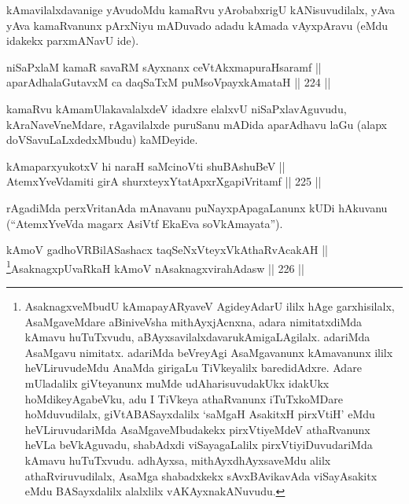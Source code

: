 \begin{artha}
kAmavilalxdavanige yAvudoMdu kamaRvu yArobabxrigU kANisuvudilalx, yAva
yAva kamaRvanunx pArxNiyu mADuvado adadu kAmada vAyxpAravu (eMdu
idakekx parxmANavU ide).
\end{artha}

\begin{shl}
niSaPxlaM kamaR savaRM sAyxnanx ceVtAkxmapuraHsaramf || \\
aparAdhalaGutavxM ca daqSaTxM puMsoV\s payxkAmataH \hfill || 224 ||  
\end{shl}

\begin{artha}
kamaRvu kAma\s mUlakavalalxdeV idadxre elalxvU niSaPxlavAguvudu,
kAraNaveVneMdare, rAgavilalxde puruSanu mADida aparAdhavu laGu (alapx
doVSavuLaLxdedxMbudu) kaMDeyide.
\end{artha}

\begin{shl}
kAmaparxyukotxV hi naraH saMcinoVti shuBAshuBeV || \\
AtemxYveVdamiti girA shurxteyxYtatApxrXgapiVritamf \hfill || 225 ||  
\end{shl}

\begin{artha}
rAgadiMda perxVritanAda mAnavanu puNayxpApagaLanunx kUDi hAkuvanu (``AtemxYveVda magarx AsiVtf EkaEva soV\s kAmayata'').
\end{artha}


\begin{shl}
kAmoV gadhoVR\s BilASashacx taqSeNxVteyxVkAthaRvAcakAH || \\
\footnote{AsaknagxveMbudU kAmapayARyaveV AgideyAdarU ililx hAge garxhisilalx, AsaMga\-veMdare aBiniveVsha mithAyxjAcnxna, adara nimitatxdiMda kAmavu huTuTxvudu, aBAyxsavilalxdavaru\break kAmigaLAgilalx. adariMda AsaMgavu nimitatx. adariMda beVreyAgi AsaMgavanunx kAmavanunx ililx heVLiruvudeMdu AnaMda girigaLu TiVkeyalilx baredidAdxre. Adare mUladalilx giVteyanunx muMde udAharisuvudakUkx idakUkx hoMdikeyAgabeVku, adu I TiVkeya athaRvanunx iTuTxkoMDare hoMduvudilalx, giVtABASayxdalilx `saMgaH AsakitxH pirxVtiH' eMdu heVLiruvudariMda AsaMgaveMbudakekx pirxVtiyeMdeV athaRvanunx heVLa beVkAguvadu, shabAdxdi viSayagaLalilx  pirxVtiyiDuvudariMda kAmavu huTuTxvudu. adhAyxsa, mithAyxdhAyxsaveMdu alilx athaRviruvudilalx, AsaMga shabadxkekx sAvxBAvikavAda viSayAsakitx eMdu BASayxdalilx alalxlilx vAKAyxnakANuvudu.}AsaknagxpUvaRkaH kAmoV nA\s \s saknagxvirahAdasw \hfill || 226 ||  
\end{shl}


